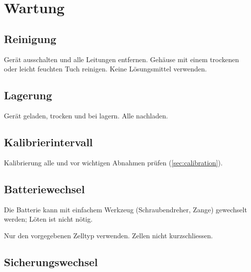 \section{Wartung}
\label{sec:maintenance}

\subsection{Reinigung}
Gerät ausschalten und alle Leitungen entfernen. Gehäuse mit einem trockenen oder leicht feuchten
Tuch reinigen. Keine Lösungsmittel verwenden.

\subsection{Lagerung}
Gerät geladen, trocken und bei  lagern. Alle  nachladen.

\subsection{Kalibrierintervall}
Kalibrierung alle  und vor wichtigen Abnahmen prüfen (\autoref{sec:calibration}).

\subsection{Batteriewechsel}
Die Batterie kann mit einfachem Werkzeug (Schraubendreher, Zange) gewechselt werden; Löten ist
nicht nötig.
\begin{warning}
    Nur den vorgegebenen Zelltyp verwenden. Zellen nicht kurzschliessen.
\end{warning}

\subsection{Sicherungswechsel}
